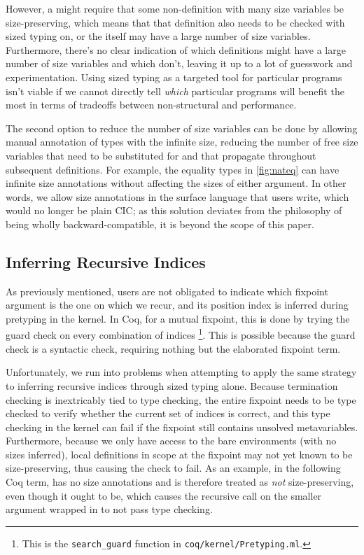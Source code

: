 However, a \cofixpoint might require that some non-\corecursive definition with many size variables be size-preserving,
which means that that definition also needs to be checked with sized typing on,
or the \cofixpoint itself may have a large number of size variables.
Furthermore, there's no clear indication of which definitions might have a large number of size variables and which don't,
leaving it up to a lot of guesswork and experimentation.
Using sized typing as a targeted tool for particular programs isn't viable
if we cannot directly tell \emph{which} particular programs will benefit the most
in terms of tradeoffs between non-structural \corecursion and performance.

The second option to reduce the number of size variables can be done by allowing manual annotation of \coinductive types with the infinite size,
reducing the number of free size variables that need to be substituted for
and that propagate throughout subsequent definitions.
For example, the equality types in \autoref{fig:nateq} can have infinite size annotations
without affecting the sizes of either  argument.
In other words, we allow size annotations in the surface language that users write,
which would no longer be plain CIC;
as this solution deviates from the philosophy of being wholly backward-compatible,
it is beyond the scope of this paper.

\subsection{Inferring Recursive Indices}\label{sec:impl:recind}

As previously mentioned, users are not obligated to indicate which fixpoint argument is the one on which we recur,
and its position index is inferred during pretyping in the kernel.
In Coq, for a mutual fixpoint, this is done by trying the guard check on every combination of indices%
\footnote{This is the \texttt{search\_guard} function in \texttt{coq/kernel/Pretyping.ml}.}.
This is possible because the guard check is a syntactic check, requiring nothing but the elaborated fixpoint term.

Unfortunately, we run into problems when attempting to apply the same strategy to inferring recursive indices through sized typing alone.
Because termination checking is inextricably tied to type checking,
the entire fixpoint needs to be type checked to verify whether the current set of indices is correct,
and this type checking in the kernel can fail if the fixpoint still contains unsolved metavariables.
Furthermore, because we only have access to the bare environments (\ie with no sizes inferred),
local definitions in scope at the fixpoint may not yet known to be size-preserving,
thus causing the check to fail.
As an example, in the following Coq term,  has no size annotations and is therefore treated as \emph{not} size-preserving,
even though it ought to be, which causes the recursive call on the smaller argument wrapped in  to not pass type checking.

